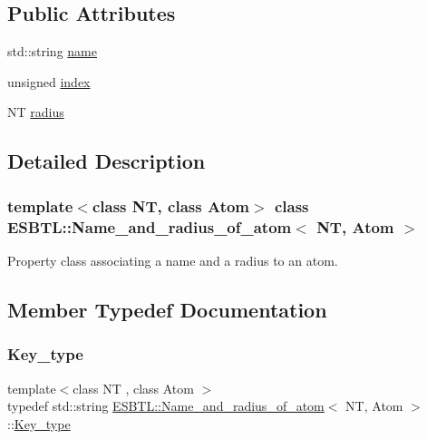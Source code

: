 \subsection*{Public Attributes}
\begin{DoxyCompactItemize}
\item 
std\+::string \hyperlink{classESBTL_1_1Name__and__radius__of__atom_a6bde09ef55b51b54d3d60a09f27a2845}{name}
\item 
unsigned \hyperlink{classESBTL_1_1Name__and__radius__of__atom_a243abe15f6d0a616a05b23850d692646}{index}
\item 
NT \hyperlink{classESBTL_1_1Name__and__radius__of__atom_a504373b559691e3ea0bfd507d9ed4ec8}{radius}
\end{DoxyCompactItemize}


\subsection{Detailed Description}
\subsubsection*{template$<$class NT, class Atom$>$\newline
class E\+S\+B\+T\+L\+::\+Name\+\_\+and\+\_\+radius\+\_\+of\+\_\+atom$<$ N\+T, Atom $>$}

Property class associating a name and a radius to an atom. 

\subsection{Member Typedef Documentation}
\mbox{\label{classESBTL_1_1Name__and__radius__of__atom_a29a9469912e1722a7da9d7f7f8201c55}} 
\subsubsection{\texorpdfstring{Key\+\_\+type}{Key\_type}}
{\footnotesize\ttfamily template$<$class NT , class Atom $>$ \\
typedef std\+::string \hyperlink{classESBTL_1_1Name__and__radius__of__atom}{E\+S\+B\+T\+L\+::\+Name\+\_\+and\+\_\+radius\+\_\+of\+\_\+atom}$<$ NT, Atom $>$\+::\hyperlink{classESBTL_1_1Name__and__radius__of__atom_a29a9469912e1722a7da9d7f7f8201c55}{Key\+\_\+type}}

